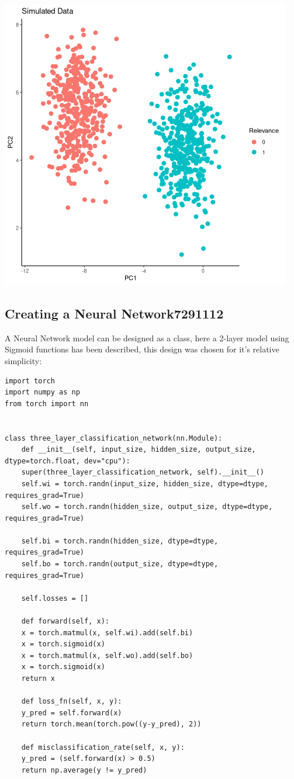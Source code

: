 \documentclass[a4paper,11pt,twoside]{article}
\begin{document}
\begin{center}
\includegraphics[width=.9\linewidth]{SimulatedData.png}
\end{center}

\subsection{Creating a Neural Network\hfill{}\textsc{7291112}}
\label{sec:org03d7b8b}
A Neural Network model can be designed as a class, here a 2-layer
model using Sigmoid functions has been described, this design was
chosen for it's relative simplicity:

\begin{verbatim}
import torch
import numpy as np
from torch import nn


class three_layer_classification_network(nn.Module):
    def __init__(self, input_size, hidden_size, output_size, dtype=torch.float, dev="cpu"):
	super(three_layer_classification_network, self).__init__()
	self.wi = torch.randn(input_size, hidden_size, dtype=dtype, requires_grad=True)
	self.wo = torch.randn(hidden_size, output_size, dtype=dtype, requires_grad=True)

	self.bi = torch.randn(hidden_size, dtype=dtype, requires_grad=True)
	self.bo = torch.randn(output_size, dtype=dtype, requires_grad=True)

	self.losses = []

    def forward(self, x):
	x = torch.matmul(x, self.wi).add(self.bi)
	x = torch.sigmoid(x)
	x = torch.matmul(x, self.wo).add(self.bo)
	x = torch.sigmoid(x)
	return x

    def loss_fn(self, x, y):
	y_pred = self.forward(x)
	return torch.mean(torch.pow((y-y_pred), 2))

    def misclassification_rate(self, x, y):
	y_pred = (self.forward(x) > 0.5)
	return np.average(y != y_pred)
\end{verbatim}
\end{document}
